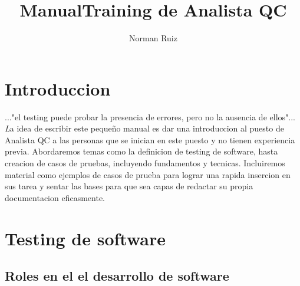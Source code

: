 \documentclass[12pt,a4paper,twoside]{article}
\author{Norman Ruiz}
\title{Manual\linebreak \linebreak Training de Analista QC}
\begin{document}
\maketitle
\newpage

\tableofcontents
\newpage

\section{Introduccion}

..."el testing puede probar la presencia de errores, pero no la ausencia de ellos"... \linebreak
\lettrine{\textit{L}}{}a idea de escribir este pequeño manual es dar una introduccion al puesto de Analista QC a las personas que se inician en este puesto y no tienen experiencia previa.
Abordaremos temas como la definicion de testing de software, hasta creacion de casos de pruebas, incluyendo fundamentos y tecnicas. 
Incluiremos material como ejemplos de casos de prueba para lograr una rapida insercion en sus tarea y sentar las bases para que sea capas de redactar su propia documentacion eficasmente.
\newpage

\section{Testing de software}

\subsection{Roles en el el desarrollo de software}
\end{document}
